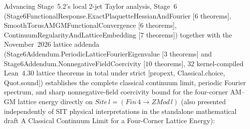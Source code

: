 \documentclass[american,11pt,letterpaper]{article}
\def\mathrm#1{#1}%
\def\texttt#1{#1}%
\def\emph#1{#1}%
\begin{document}
Advancing Stage~5.2's local 2-jet Taylor analysis, Stage~6 (\texttt{Stage6FunctionalResponse.\allowbreak{}ExactPlaquetteHessianAndFourier} [$6$ theorems], \texttt{SmoothTorusAMGMFunctionalConvergence} [$6$ theorems], \texttt{ContinuumRegularityAndLatticeEmbedding} [$7$ theorems]) together with the November~2026 lattice addenda (\texttt{Stage6Addendum.\allowbreak{}PeriodicLatticeFourierEigenvalue} [$3$ theorems] and \texttt{Stage6Addendum.\allowbreak{}NonnegativeFieldCoercivity} [$10$ theorems], $32$ kernel-compiled Lean~4.30 lattice theorems in total under strict \texttt{[propext, Classical.\allowbreak{}choice, Quot.\allowbreak{}sound]}) establishes the complete \emph{classical} continuum limit, periodic Fourier spectrum, and sharp nonnegative-field coercivity bound for the four-corner AM--GM lattice energy directly on $\mathrm{Site}\,l = (\mathrm{Fin}\,4 \to \mathrm{ZMod}\,l)$ (also presented independently of SIT physical interpretations in the standalone mathematical draft \emph{A Classical Continuum Limit for a Four-Corner Lattice Energy}):
\end{document}
